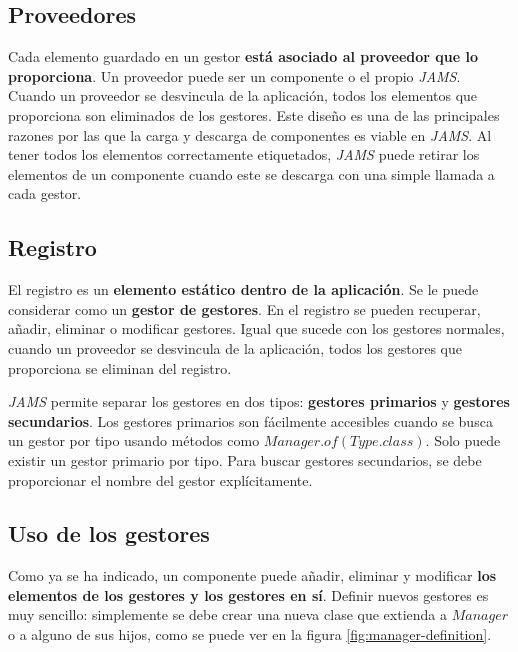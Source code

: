 \subsection{Proveedores}\label{subsec:proveedores}

Cada elemento guardado en un gestor \textbf{está asociado al proveedor que lo proporciona}.
Un proveedor puede ser un componente o el propio \textit{JAMS}.
Cuando un proveedor se desvincula de la aplicación, todos
los elementos que proporciona son eliminados de los gestores.
Este diseño es una de las principales razones por las que la carga y descarga de
componentes es viable en \textit{JAMS}.
Al tener todos los elementos correctamente etiquetados, \textit{JAMS}
puede retirar los elementos de un componente cuando este se
descarga con una simple llamada a cada gestor.

\subsection{Registro}\label{subsec:registro}

El registro es un \textbf{elemento estático dentro de la aplicación}.
Se le puede considerar como un \textbf{gestor de gestores}.
En el registro se pueden recuperar, añadir, eliminar o modificar gestores.
Igual que sucede con los gestores normales, cuando un proveedor se desvincula de la aplicación,
todos los gestores que proporciona se eliminan del registro.

\textit{JAMS} permite separar los gestores en dos tipos:
\textbf{gestores primarios} y \textbf{gestores secundarios}.
Los gestores primarios son fácilmente accesibles cuando se busca un gestor por tipo
usando métodos como $Manager.of(Type.class)$.
Solo puede existir un gestor primario por tipo.
Para buscar gestores secundarios, se debe proporcionar el nombre del gestor explícitamente.

\subsection{Uso de los gestores}\label{subsec:uso-de-los-gestores}

Como ya se ha indicado, un componente puede añadir, eliminar
y modificar \textbf{los elementos de los gestores y los gestores en sí}.
Definir nuevos gestores es muy sencillo: simplemente se debe crear
una nueva clase que extienda a $Manager$ o a alguno de sus hijos,
como se puede ver en la figura \ref{fig:manager-definition}.

